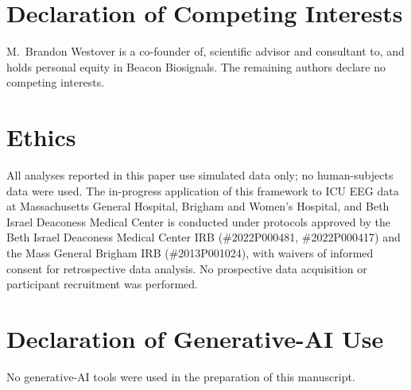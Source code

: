 \section*{Declaration of Competing Interests}

M.\ Brandon Westover is a co-founder of, scientific advisor and consultant to, and
holds personal equity in Beacon Biosignals. The remaining authors declare no
competing interests.

\section*{Ethics}

All analyses reported in this paper use simulated data only; no human-subjects data
were used. The in-progress application of this framework to ICU EEG data at
Massachusetts General Hospital, Brigham and Women's Hospital, and Beth Israel Deaconess
Medical Center is conducted under protocols approved by the Beth Israel Deaconess
Medical Center IRB (\#2022P000481, \#2022P000417) and the Mass General Brigham IRB
(\#2013P001024), with waivers of informed consent for retrospective data analysis.
No prospective data acquisition or participant recruitment was performed.

\section*{Declaration of Generative-AI Use}

No generative-AI tools were used in the preparation of this manuscript.

